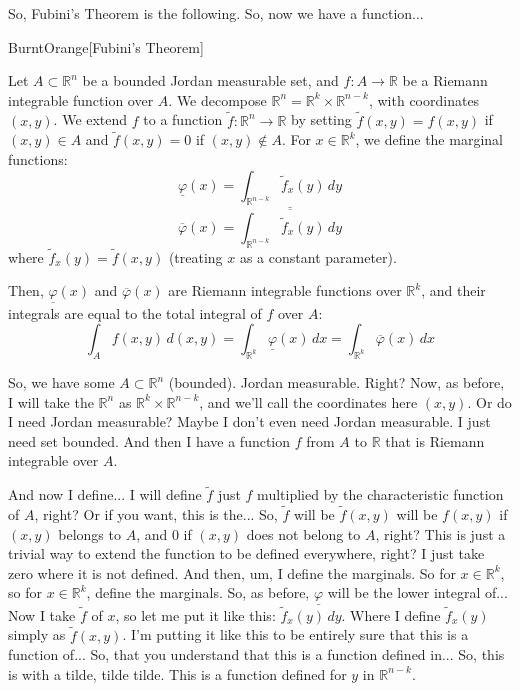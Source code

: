 \begin{spoken-clean}[00:16:58 - 00:17:02]
So, Fubini's Theorem is the following. So, now we have a function...
\end{spoken-clean}

\begin{color-box}{BurntOrange}[Fubini's Theorem]
\begin{theorem}
\label{thm:fubini-formal}
Let $A \subset \mathbb{R}^n$ be a bounded Jordan measurable set, and $f: A \to \mathbb{R}$ be a Riemann integrable function over $A$.
We decompose $\mathbb{R}^n = \mathbb{R}^k \times \mathbb{R}^{n-k}$, with coordinates $(x,y)$.
We extend $f$ to a function $\tilde{f}: \mathbb{R}^n \to \mathbb{R}$ by setting $\tilde{f}(x,y) = f(x,y)$ if $(x,y) \in A$ and $\tilde{f}(x,y) = 0$ if $(x,y) \notin A$.
For $x \in \mathbb{R}^k$, we define the marginal functions:
\[
\underline{\varphi}(x) = \underline{\int_{\mathbb{R}^{n-k}} \tilde{f}_x(y) \, dy}
\]
\[
\overline{\varphi}(x) = \overline{\int_{\mathbb{R}^{n-k}} \tilde{f}_x(y) \, dy}
\]
where $\tilde{f}_x(y) = \tilde{f}(x,y)$ (treating $x$ as a constant parameter).

Then, $\underline{\varphi}(x)$ and $\overline{\varphi}(x)$ are Riemann integrable functions over $\mathbb{R}^k$, and their integrals are equal to the total integral of $f$ over $A$:
\[
\int_A f(x,y) \, d(x,y) = \int_{\mathbb{R}^k} \underline{\varphi}(x) \, dx = \int_{\mathbb{R}^k} \overline{\varphi}(x) \, dx
\]
\end{theorem}
\end{color-box}

\begin{spoken-clean}[00:17:02 - 00:17:22]
So, we have some $A \subset \mathbb{R}^n$ (bounded). Jordan measurable. Right? Now, as before, I will take the $\mathbb{R}^n$ as $\mathbb{R}^k \times \mathbb{R}^{n-k}$, and we'll call the coordinates here $(x,y)$. Or do I need Jordan measurable? Maybe I don't even need Jordan measurable. I just need set bounded. And then I have a function $f$ from $A$ to $\mathbb{R}$ that is Riemann integrable over $A$.
\end{spoken-clean}

\begin{spoken-clean}[00:17:36 - 00:18:53]
And now I define... I will define $\tilde{f}$ just $f$ multiplied by the characteristic function of $A$, right? Or if you want, this is the... So, $\tilde{f}$ will be $\tilde{f}(x,y)$ will be $f(x,y)$ if $(x,y)$ belongs to $A$, and $0$ if $(x,y)$ does not belong to $A$, right? This is just a trivial way to extend the function to be defined everywhere, right? I just take zero where it is not defined. And then, um, I define the marginals. So for $x \in \mathbb{R}^k$, so for $x \in \mathbb{R}^k$, define the marginals. So, as before, $\underline{\varphi}$ will be the lower integral of... Now I take $\tilde{f}$ of $x$, so let me put it like this: $\tilde{f}_x(y) \, dy$. Where I define $\tilde{f}_x(y)$ simply as $\tilde{f}(x,y)$. I'm putting it like this to be entirely sure that this is a function of... So, that you understand that this is a function defined in... So, this is with a tilde, tilde tilde. This is a function defined for $y$ in $\mathbb{R}^{n-k}$.
\end{spoken-clean}

